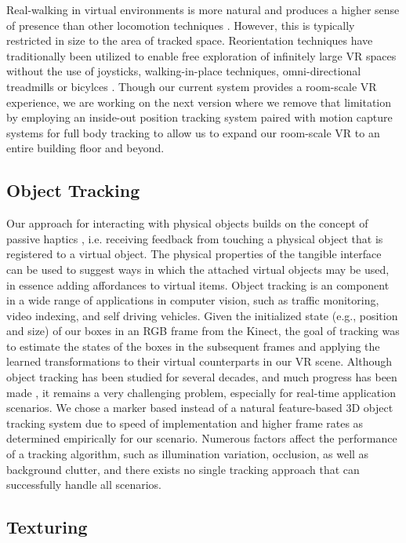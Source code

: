 \documentclass{sigchi}
\begin{document}
Real-walking in virtual environments is more natural and produces a higher sense of presence than other locomotion techniques \cite{usoh1999walking,slater1995taking}. However, this is typically restricted in size to the area of tracked space. Reorientation techniques have traditionally been utilized to enable free exploration of infinitely large VR spaces without the use of joysticks, walking-in-place techniques, omni-directional treadmills or bicylces \cite{brooks1987walkthrough,darken1997omni,iwata1999walking}. Though our current system provides a room-scale VR experience, we are working on the next version where we remove that limitation by employing an inside-out position tracking system paired with motion capture systems for full body tracking to allow us to expand our room-scale VR to an entire building floor and beyond. 


\subsection{Object Tracking}
Our approach for interacting with physical objects builds on the concept of passive haptics \cite{hoffman1998physically}, i.e. receiving feedback from touching a physical object that is registered to a virtual object. The physical properties of the tangible interface can be used to suggest ways in which the attached virtual objects may be used, in essence adding affordances to virtual items. Object tracking is an component in a wide range of applications in computer vision, such as traffic monitoring, video indexing, and self driving vehicles. Given the initialized state (e.g., position and size) of our boxes in an RGB frame from the Kinect, the goal of tracking was to estimate the states of the boxes in the subsequent frames and applying the learned transformations to their virtual counterparts in our VR scene. Although object tracking has been studied for several decades, and much progress has been made \cite{yilmaz2006object}, it remains a very challenging problem, especially for real-time application scenarios. We chose a marker based instead of a natural feature-based 3D object tracking system due to speed of implementation and higher frame rates as determined empirically for our scenario. Numerous factors affect the performance of a tracking algorithm, such as illumination variation, occlusion, as well as background clutter, and there exists no single tracking approach that can successfully handle all scenarios.

\subsection{Texturing}
\end{document}
